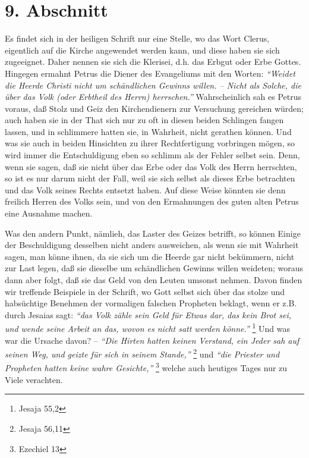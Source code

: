 \section{9. Abschnitt} \label{kap12_ab9}

Es findet sich in der heiligen Schrift nur eine Stelle, wo das Wort
Clerus,
eigentlich auf die Kirche angewendet werden kann, und diese haben sie sich
zugeeignet. Daher nennen sie sich die Klerisei, d.h. das Erbgut oder Erbe
Gottes. Hingegen ermahnt Petrus die Diener des
Evangeliums mit den Worten:
\textit{"`Weidet die Heerde Christi nicht um schändlichen Gewinns willen. --
Nicht
als Solche, die über das Volk (oder Erbtheil des Herrn) herrschen."'}
Wahrscheinlich sah es Petrus voraus, daß Stolz und Geiz den Kirchendienern zur
Versuchung gereichen würden; auch haben sie in der That sich nur zu oft in
diesen beiden Schlingen fangen lassen, und in schlimmere hatten sie, in
Wahrheit, nicht gerathen können. Und was sie auch in beiden Hinsichten zu ihrer
Rechtfertigung vorbringen mögen, so wird immer die Entschuldigung eben so
schlimm als der Fehler selbst sein. Denn, wenn sie sagen, daß sie nicht über das
Erbe oder das Volk des Herrn herrschten, so ist es nur darum nicht der Fall,
weil sie sich selbst als dieses Erbe betrachten und das Volk seines Rechts
entsetzt haben. Auf diese Weise könnten sie denn freilich Herren des Volks sein,
und von den Ermahnungen des guten alten Petrus eine Ausnahme machen.

\medskip

Was den andern Punkt, nämlieh, das Laster des Geizes
betrifft, so können Einige
der Beschuldigung desselben nicht anders ausweichen, als wenn sie mit Wahrheit
sagen, man könne ihnen, da sie sich um die Heerde gar nicht bekümmern, nicht zur
Last legen, daß sie dieselbe um schändlichen Gewinns willen weideten; woraus
dann aber folgt, daß sie das Geld von den Leuten umsonst nehmen. Davon finden
wir treffende Beispiele in der Schrift, wo Gott selbst sich über das stolze und
habsüchtige Benehmen der vormaligen falschen Propheten beklagt, wenn er z.B.
durch Jesaias sagt:
\textit{"`das Volk zähle sein Geld für Etwas dar, das kein Brot sei,
und wende seine Arbeit an das, wovon es nicht satt werden könne."'}
\footnote{Jesaja 55,2}
Und was war die Ursache davon? --
\textit{"`Die Hirten hatten keinen Verstand, ein
Jeder sah auf seinen Weg, und geizte für sich in seinem Stande,"'}
\footnote{Jesaja 56,11}
 und
\textit{"`die Priester und Propheten hatten keine wahre
Gesichte,"'}
\footnote{Ezechiel 13}
welche auch heutiges Tages nur zu Viele
verachten.

